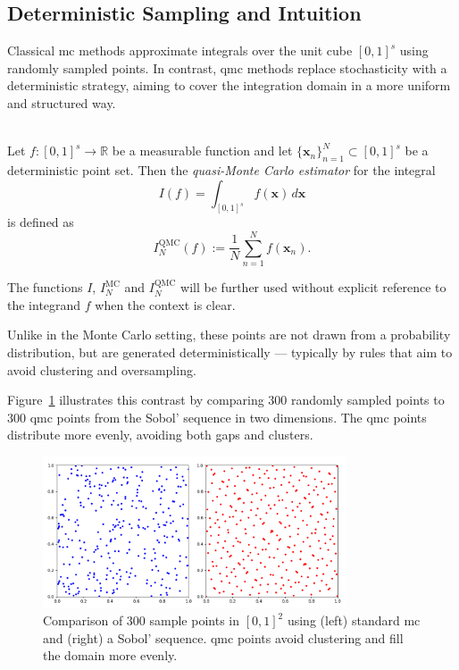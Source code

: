 \subsection{Deterministic Sampling and Intuition}

Classical \ac{mc} methods approximate integrals over the unit cube $[0,1]^s$
using randomly sampled points. In contrast, \ac{qmc} methods replace
stochasticity with a deterministic strategy, aiming to cover the integration
domain in a more uniform and structured way.

\begin{definition} \ \\
Let $f \colon [0,1]^s \to \mathbb{R}$ be a measurable function and let
$\{\boldsymbol{x}_n\}_{n=1}^{N} \subset [0,1]^s$ be a deterministic point set.
Then the \emph{quasi-Monte Carlo estimator} for the integral
\begin{equation*}
    I(f) = \int_{[0,1]^s} f(\boldsymbol{x}) \, d\boldsymbol{x}
\end{equation*}
is defined as
\begin{equation}
I_N^{\mathrm{QMC}}(f) := \frac{1}{N} \sum_{n=1}^{N} f(\boldsymbol{x}_n).
\end{equation}
\end{definition}

The functions $I$, $I_N^{\mathrm{MC}}$ and $I_N^{\mathrm{QMC}}$ will be further
used without explicit reference to the integrand $f$ when the context is clear.

Unlike in the Monte Carlo setting, these points are not drawn from a probability
distribution, but are generated deterministically — typically by rules that aim
to avoid clustering and oversampling.

Figure~\ref{fig:mc-vs-qmc} illustrates this contrast by comparing $300$ randomly
sampled points to $300$ \ac{qmc} points from the Sobol' sequence in two
dimensions. The \ac{qmc} points distribute more evenly, avoiding both
gaps and clusters.

\begin{figure}[H]
  \centering
  \includegraphics[width=0.8\textwidth]{Figures/mc_vs_qmc.png}
  \caption{Comparison of $300$ sample points in $[0,1]^2$ using (left) standard 
  \ac{mc} and (right) a Sobol' sequence. \ac{qmc} points avoid clustering and 
  fill the domain more evenly.}
  \label{fig:mc-vs-qmc}
\end{figure}


